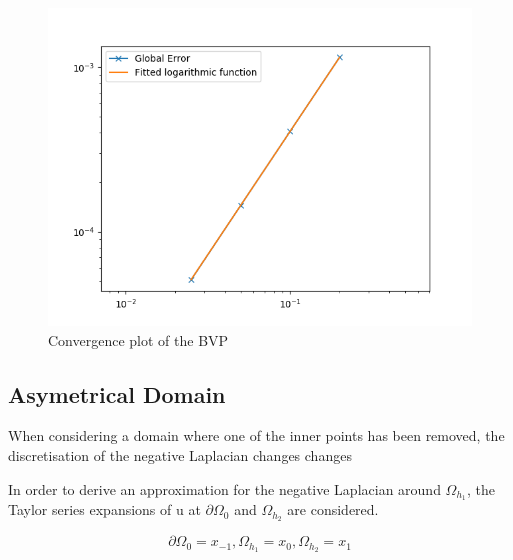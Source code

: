 \documentclass{article}
\begin{document}
\begin{figure}[H]
    \centering
    \includegraphics[width=.9\linewidth]{convergence.png}
    \caption{Convergence plot of the BVP}
\end{figure}

\subsection{Asymetrical Domain}
When considering a domain where one of the inner points has been removed, the discretisation of the negative Laplacian changes changes
\begin{figure}[H]
    \centering
\end{figure}

In order to derive an approximation for the negative Laplacian around $\Omega_{h_1}$, the Taylor series expansions of u at $\partial \Omega_0$ and $\Omega_{h_2}$ are considered.

\begin{equation}
	\partial \Omega_0 = x_{-1},  \Omega_{h_1} = x_0, \Omega_{h_2} = x_1
\end{equation}
\end{document}
